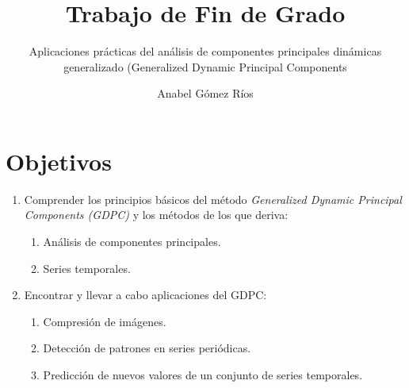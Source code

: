 \documentclass[leqno]{beamer}
\title{Trabajo de Fin de Grado}
\subtitle{Aplicaciones prácticas del análisis de componentes principales dinámicas generalizado (Generalized Dynamic Principal Components}
\author{Anabel Gómez Ríos}
\begin{document}
\begin{frame}
\titlepage
\end{frame}

\begin{frame}
\tableofcontents
\end{frame}

\section{Objetivos}
\begin{frame}
\begin{enumerate}
	\item Comprender los principios básicos del método \textit{Generalized Dynamic Principal Components (GDPC)} y los métodos de los que deriva:
	\begin{enumerate}
		\item Análisis de componentes principales.
		\item Series temporales.
	\end{enumerate}
	\item Encontrar y llevar a cabo aplicaciones del GDPC:
	\begin{enumerate}
		\item Compresión de imágenes.
		\item Detección de patrones en series periódicas.
		\item Predicción de nuevos valores de un conjunto de series temporales.
	\end{enumerate}
\end{enumerate}
\end{frame}
\end{document}

